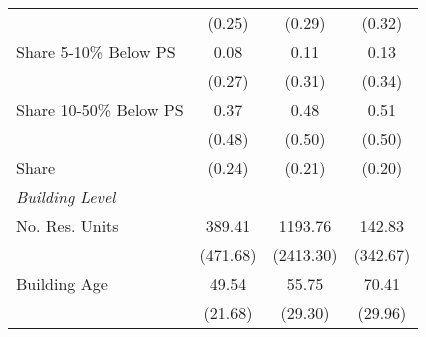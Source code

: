 \begin{tabular}{l*{3}{c}}
                &   (0.25)&   (0.29)&   (0.32)\\
\addlinespace
Share 5-10\% Below PS    &     0.08&     0.11&     0.13\\
                &   (0.27)&   (0.31)&   (0.34)\\
\addlinespace
Share 10-50\% Below PS     &     0.37&     0.48&     0.51\\
                &   (0.48)&   (0.50)&   (0.50)\\
\addlinespace
Share \>50%
                &   (0.24)&   (0.21)&   (0.20)\\
\addlinespace
\emph{Building Level}&         &         &         \\
\addlinespace
No. Res. Units        &   389.41&  1193.76&   142.83\\
                & (471.68)&(2413.30)& (342.67)\\
\addlinespace
Building Age    &    49.54&    55.75&    70.41\\
                &  (21.68)&  (29.30)&  (29.96)\\
\bottomrule
\end{tabular}
